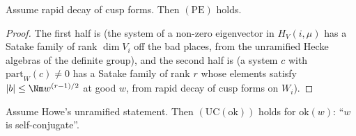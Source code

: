 \begin{lemma}\label{pf:stageU:paramsex}
Assume rapid decay of cusp forms. Then $(\mathrm{PE})$ holds.
\end{lemma}

\begin{proof}
The first half is  (the system of a non-zero eigenvector in $H_V(i,\mu)$ has a
Satake family of rank $\dim V_i$ off the bad places, from the unramified Hecke algebras of the definite group), and the second
half is  (a system $c$ with $\mathrm{part}_W(c)\ne0$ has a Satake family of rank $r$ whose
elements satisfy $|b|\le\Nm w^{(r-1)/2}$ at good $w$, from rapid decay of cusp forms on $W_i$).
\end{proof}

\begin{lemma}\label{pf:stageU:unrinert}
Assume Howe's unramified statement. Then $(\mathrm{UC}(\mathrm{ok}))$ holds for $\mathrm{ok}(w)$: ``$w$ is self-conjugate''.
\end{lemma}

